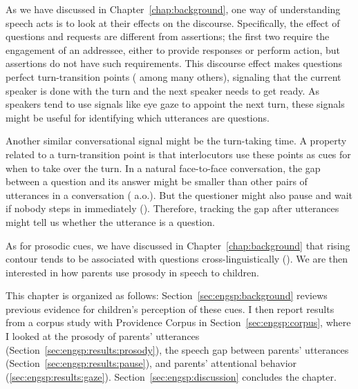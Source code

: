 


As we have discussed in Chapter~\ref{chap:background}, one way of understanding speech acts is to look at their effects on the discourse. Specifically, the effect of questions and requests are different from assertions; the first two require the engagement of an addressee, either to provide responses or perform action, but assertions do not have such requirements. This discourse effect makes questions perfect turn-transition points (\cite{duncan1972turn} among many others), signaling that the current speaker is done with the turn and the next speaker needs to get ready. As speakers tend to use signals like eye gaze to appoint the next turn, these signals might be useful for identifying which utterances are questions. 

Another similar conversational signal might be the turn-taking time. A property related to a turn-transition point is that interlocutors use these points as cues for when to take over the turn. In a natural face-to-face conversation, the gap between a question and its answer might be smaller than other pairs of utterances in a conversation (\citealt{tice2011turn} a.o.). But the questioner might also pause and wait if nobody steps in immediately (\cite{sacks1978pause}). Therefore, tracking the gap after utterances might tell us whether the utterance is a question.

As for prosodic cues, we have discussed in Chapter~\ref{chap:background} that rising contour tends to be associated with questions cross-linguistically (\cite{gussenhovenchen2000}). We are then interested in how parents use prosody in speech to children.

This chapter is organized as follows: Section~\ref{sec:engsp:background} reviews previous evidence for children's perception of these cues. I then report results from a corpus study with Providence Corpus in Section~\ref{sec:engsp:corpus}, where I looked at the prosody of parents' utterances (Section~\ref{sec:engsp:results:prosody}), the speech gap between parents' utterances (Section~\ref{sec:engsp:results:pause}), and parents' attentional behavior (\ref{sec:engsp:results:gaze}).
Section~\ref{sec:engsp:discussion} concludes the chapter.


